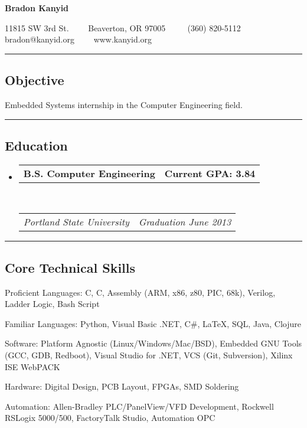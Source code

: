 \documentclass[10pt,letterpaper]{article}
\makeatletter
\newenvironment{indentsection}[1]%
{\begin{list}{}%
	{\setlength{\leftmargin}{#1}}%
	\item[]%
}
{\end{list}}
\newcommand{\headerrow}[2]
{\begin{tabular*}{\linewidth}{l@{\extracolsep{\fill}}r}
	#1 &
	#2 \\
\end{tabular*}}
\newcommand{\CPP}
{C\nolinebreak[4]\hspace{-.05em}\raisebox{.22ex}{\footnotesize\bf ++}}
\makeatother
\begin{document}
\begin{center}
{\LARGE \textbf{Bradon Kanyid}}

11815 SW 3rd St.\ \ \textbullet
\ \ Beaverton, OR 97005 \ \ \textbullet
\ \ (360) 820-5112\\
bradon@kanyid.org\ \ \textbullet
\ \ www.kanyid.org
\end{center}

\hrule
\vspace{-0.4em}
\subsection*{Objective}
\begin{indentsection}{\parindent}
\begin{description*}
	\item Embedded Systems internship in the Computer Engineering field.
\end{description*}
\end{indentsection}
\vspace{1em}

\hrule
\vspace{-0.4em}
\subsection*{Education}

\begin{itemize}
	\parskip=0.1em

	\item 
	\headerrow
                {\textbf{B.S. Computer Engineering}}
		{\textbf{Current GPA: 3.84}}
	\\
	\headerrow
		{\emph{Portland State University}}
		{\emph{Graduation June 2013}}
\end{itemize}
\vspace{1em}


\hrule
\vspace{-0.4em}
\subsection*{Core Technical Skills}

\begin{indentsection}{\parindent}
\begin{description*}
	\item[Proficient Languages:]
    C, \CPP, Assembly (ARM, x86, z80, PIC, 68k), Verilog, Ladder Logic, Bash Script 
	\item[Familiar Languages:]
    Python, Visual Basic .NET, C\#, \LaTeX, SQL, Java, Clojure 
	\item[Software:]
    Platform Agnostic (Linux/Windows/Mac/BSD), Embedded GNU Tools (GCC, GDB, Redboot), Visual Studio for .NET, VCS (Git, Subversion), Xilinx ISE WebPACK
	\item[Hardware:]
    Digital Design, PCB Layout, FPGAs, SMD Soldering 
	\item[Automation:]
    Allen-Bradley PLC/PanelView/VFD Development, Rockwell RSLogix 5000/500, FactoryTalk Studio, Automation OPC 	
\end{description*}
\end{indentsection}
\vspace{1em}
\end{document}
